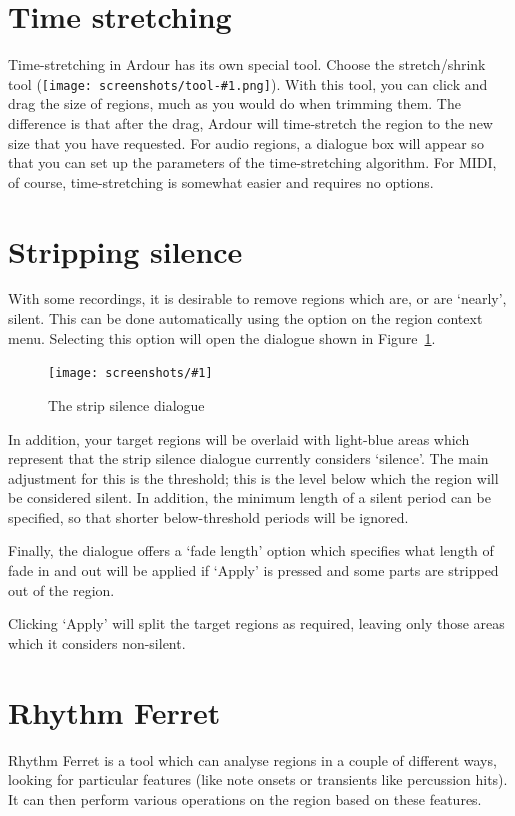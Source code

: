 \documentclass[10pt,a4paper]{book}
\newcommand{\menu}[1]{\emph{\StrSubstitute{#1}{,}{ $\rightarrow$ }}}
\newcommand{\screenshot}[3]{%
\begin{figure}[ht]%
\begin{center}
\texttt{[image: screenshots/\#1]}
\end{center}
\caption{#2}
\label{#3}
\end{figure}}
\newcommand{\inlinetool}[1]{\texttt{[image: screenshots/tool-\#1.png]}}
\begin{document}
{\section{Time stretching}

Time-stretching in Ardour has its own special tool.  Choose the
stretch/shrink tool (\inlinetool{stretch}).
With this tool, you can click and drag the size of regions, much as
you would do when trimming them.  The difference is that after the
drag, Ardour will time-stretch the region to the new size that you
have requested.  For audio regions, a dialogue box will appear so that
you can set up the parameters of the time-stretching algorithm.  For
MIDI, of course, time-stretching is somewhat easier and requires no
options.


\section{Stripping silence}

With some recordings, it is desirable to remove regions which are, or
are `nearly', silent.  This can be done automatically using the
\menu{Edit,Strip Silence\ldots} option on the region context menu.
Selecting this option will open the dialogue shown in
Figure~\ref{fig:strip-silence-dialogue}.

\screenshot{strip-silence-dialogue.png}{The strip silence dialogue}{fig:strip-silence-dialogue}

In addition, your target regions will be overlaid with light-blue
areas which represent that the strip silence dialogue currently
considers `silence'.  The main adjustment for this is the threshold;
this is the level below which the region will be considered silent.
In addition, the minimum length of a silent period can be specified,
so that shorter below-threshold periods will be ignored.

Finally, the dialogue offers a `fade length' option which specifies
what length of fade in and out will be applied if `Apply' is pressed
and some parts are stripped out of the region.

Clicking `Apply' will split the target regions as required, leaving
only those areas which it considers non-silent.


\section{Rhythm Ferret}

Rhythm Ferret is a tool which can analyse regions in a couple of
different ways, looking for particular features (like note onsets or
transients like percussion hits).  It can then perform various
operations on the region based on these features.

}
\end{document}
